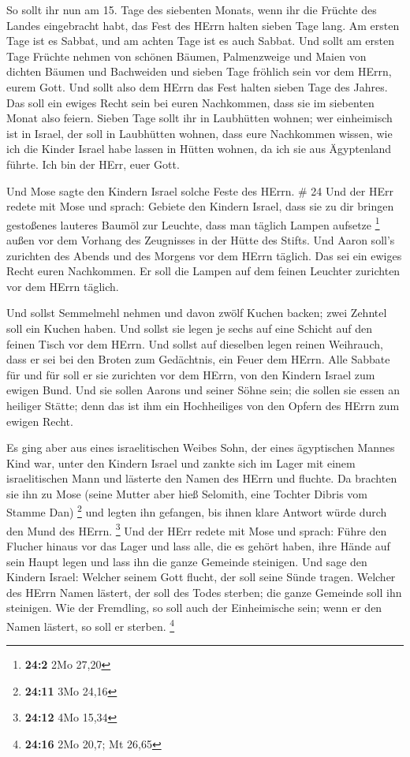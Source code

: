  So sollt ihr nun am 15. Tage des siebenten Monats, wenn
ihr die Früchte des Landes eingebracht habt, das Fest des HErrn halten
sieben Tage lang. Am ersten Tage ist es Sabbat, und am achten Tage ist
es auch Sabbat.  Und sollt am ersten Tage Früchte nehmen
von schönen Bäumen, Palmenzweige und Maien von dichten Bäumen und
Bachweiden und sieben Tage fröhlich sein vor dem HErrn, eurem Gott.
 Und sollt also dem HErrn das Fest halten sieben Tage des
Jahres. Das soll ein ewiges Recht sein bei euren Nachkommen, dass sie im
siebenten Monat also feiern.  Sieben Tage sollt ihr in
Laubhütten wohnen; wer einheimisch ist in Israel, der soll in Laubhütten
wohnen,  dass eure Nachkommen wissen, wie ich die Kinder
Israel habe lassen in Hütten wohnen, da ich sie aus Ägyptenland führte.
Ich bin der HErr, euer Gott.

 Und Mose sagte den Kindern Israel solche Feste des HErrn.
\# 24  Und der HErr redete mit Mose und sprach: 
Gebiete den Kindern Israel, dass sie zu dir bringen gestoßenes lauteres
Baumöl zur Leuchte, dass man täglich Lampen aufsetze \footnote{\textbf{24:2}
  2Mo 27,20}  außen vor dem Vorhang des Zeugnisses in der
Hütte des Stifts. Und Aaron soll's zurichten des Abends und des Morgens
vor dem HErrn täglich. Das sei ein ewiges Recht euren Nachkommen.
 Er soll die Lampen auf dem feinen Leuchter zurichten vor
dem HErrn täglich.

 Und sollst Semmelmehl nehmen und davon zwölf Kuchen backen;
zwei Zehntel soll ein Kuchen haben.  Und sollst sie legen je
sechs auf eine Schicht auf den feinen Tisch vor dem HErrn. 
Und sollst auf dieselben legen reinen Weihrauch, dass er sei bei den
Broten zum Gedächtnis, ein Feuer dem HErrn.  Alle Sabbate
für und für soll er sie zurichten vor dem HErrn, von den Kindern Israel
zum ewigen Bund.  Und sie sollen Aarons und seiner Söhne
sein; die sollen sie essen an heiliger Stätte; denn das ist ihm ein
Hochheiliges von den Opfern des HErrn zum ewigen Recht.

 Es ging aber aus eines israelitischen Weibes Sohn, der
eines ägyptischen Mannes Kind war, unter den Kindern Israel und zankte
sich im Lager mit einem israelitischen Mann  und lästerte
den Namen des HErrn und fluchte. Da brachten sie ihn zu Mose (seine
Mutter aber hieß Selomith, eine Tochter Dibris vom Stamme Dan)
\footnote{\textbf{24:11} 3Mo 24,16}  und legten ihn
gefangen, bis ihnen klare Antwort würde durch den Mund des HErrn.
\footnote{\textbf{24:12} 4Mo 15,34}  Und der HErr redete
mit Mose und sprach:  Führe den Flucher hinaus vor das
Lager und lass alle, die es gehört haben, ihre Hände auf sein Haupt
legen und lass ihn die ganze Gemeinde steinigen.  Und sage
den Kindern Israel: Welcher seinem Gott flucht, der soll seine Sünde
tragen.  Welcher des HErrn Namen lästert, der soll des
Todes sterben; die ganze Gemeinde soll ihn steinigen. Wie der Fremdling,
so soll auch der Einheimische sein; wenn er den Namen lästert, so soll
er sterben. \footnote{\textbf{24:16} 2Mo 20,7; Mt 26,65}

